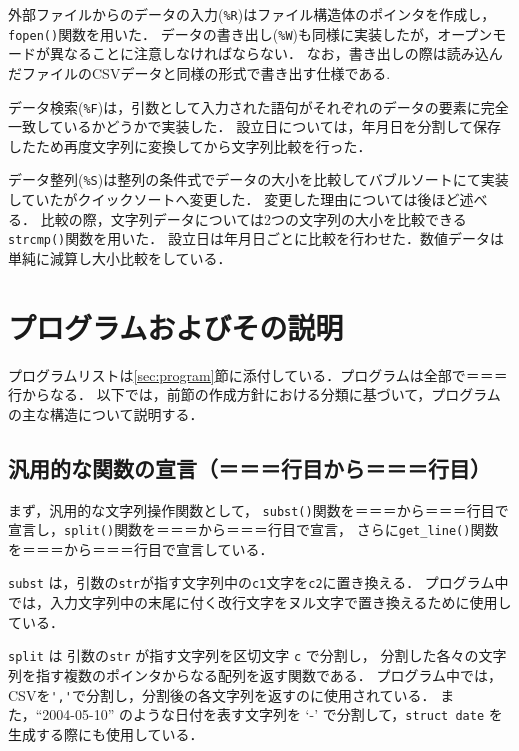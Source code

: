 \documentclass[a4j,11pt]{jarticle}
\begin{document}
外部ファイルからのデータの入力(\verb|%R|)はファイル構造体のポインタを作成し，\verb|fopen()|関数を用いた．
データの書き出し(\verb|%W|)も同様に実装したが，オープンモードが異なることに注意しなければならない．
なお，書き出しの際は読み込んだファイルのCSVデータと同様の形式で書き出す仕様である.

データ検索(\verb|%F|)は，引数として入力された語句がそれぞれのデータの要素に完全一致しているかどうかで実装した．
設立日については，年月日を分割して保存したため再度文字列に変換してから文字列比較を行った．

データ整列(\verb|%S|)は整列の条件式でデータの大小を比較してバブルソートにて実装していたがクイックソートへ変更した．
変更した理由については後ほど述べる．
比較の際，文字列データについては2つの文字列の大小を比較できる\verb|strcmp()|関数を用いた．
設立日は年月日ごとに比較を行わせた．数値データは単純に減算し大小比較をしている．


\section{プログラムおよびその説明}\label{sec:explain}

プログラムリストは\ref{sec:program}節に添付している．プログラムは全部で＝＝＝行からなる．
以下では，前節の作成方針における分類に基づいて，プログラムの主な構造について説明する．

\subsection{汎用的な関数の宣言（＝＝＝行目から＝＝＝行目）}

まず，汎用的な文字列操作関数として，
\verb|subst()|関数を＝＝＝から＝＝＝行目で宣言し，\verb|split()|関数を＝＝＝から＝＝＝行目で宣言，
さらに\verb|get_line()|関数を＝＝＝から＝＝＝行目で宣言している．

\verb|subst| は，引数の\verb|str|が指す文字列中の\verb|c1|文字を\verb|c2|に置き換える．
プログラム中では，入力文字列中の末尾に付く改行文字をヌル文字で置き換えるために使用している．

\verb|split| は 引数の\verb|str| が指す文字列を区切文字 \verb|c| で分割し，
分割した各々の文字列を指す複数のポインタからなる配列を返す関数である．
プログラム中では，CSVを\verb|','|で分割し，分割後の各文字列を返すのに使用されている．
また，``2004-05-10'' のような日付を表す文字列を `-' で分割して，\verb|struct date| を生成する際にも使用している．
\end{document}
